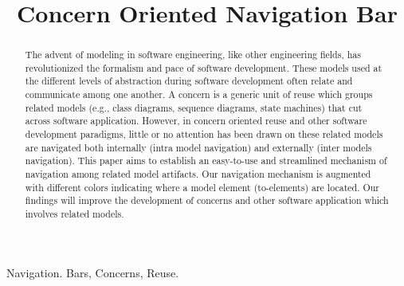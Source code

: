 \documentclass[conference]{IEEEtran}
\begin{document}

\title{Concern Oriented Navigation Bar}



\author
{
\and
{}
}
\maketitle



\begin{abstract}
The advent of modeling in software engineering, like other engineering fields, has revolutionized the formalism and pace of software development. These models used at the different levels of abstraction during software development often relate and communicate among one another. A concern is a generic unit of reuse which groups related models (e.g., class diagrams, sequence diagrams, state machines) that cut across software application. However, in concern oriented reuse and other software development paradigms, little or no attention has been drawn on these related models are navigated both internally (intra model navigation) and externally (inter models navigation). This paper aims to establish an easy-to-use and streamlined mechanism of navigation among related model artifacts. Our navigation mechanism is augmented with different colors indicating where a model element (to-elements) are located. Our findings will improve the development of concerns and other software application which involves related models.
\end{abstract}


\begin {IEEEkeywords}
Navigation. Bars, Concerns, Reuse.
\end{IEEEkeywords}

 



\end{document}
